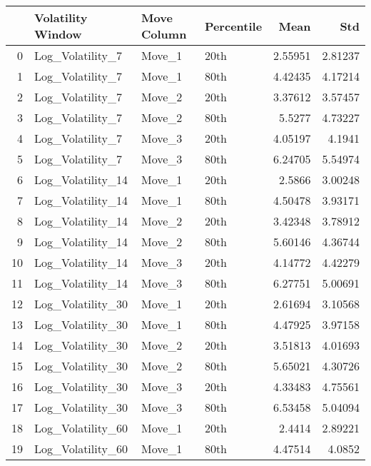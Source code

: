 \begin{tabular}{rlllrr}
\hline
    & Volatility Window   & Move Column   & Percentile   &    Mean &     Std \\
\hline
  0 & Log\_Volatility\_7    & Move\_1        & 20th         & 2.55951 & 2.81237 \\
  1 & Log\_Volatility\_7    & Move\_1        & 80th         & 4.42435 & 4.17214 \\
  2 & Log\_Volatility\_7    & Move\_2        & 20th         & 3.37612 & 3.57457 \\
  3 & Log\_Volatility\_7    & Move\_2        & 80th         & 5.5277  & 4.73227 \\
  4 & Log\_Volatility\_7    & Move\_3        & 20th         & 4.05197 & 4.1941  \\
  5 & Log\_Volatility\_7    & Move\_3        & 80th         & 6.24705 & 5.54974 \\
  6 & Log\_Volatility\_14   & Move\_1        & 20th         & 2.5866  & 3.00248 \\
  7 & Log\_Volatility\_14   & Move\_1        & 80th         & 4.50478 & 3.93171 \\
  8 & Log\_Volatility\_14   & Move\_2        & 20th         & 3.42348 & 3.78912 \\
  9 & Log\_Volatility\_14   & Move\_2        & 80th         & 5.60146 & 4.36744 \\
 10 & Log\_Volatility\_14   & Move\_3        & 20th         & 4.14772 & 4.42279 \\
 11 & Log\_Volatility\_14   & Move\_3        & 80th         & 6.27751 & 5.00691 \\
 12 & Log\_Volatility\_30   & Move\_1        & 20th         & 2.61694 & 3.10568 \\
 13 & Log\_Volatility\_30   & Move\_1        & 80th         & 4.47925 & 3.97158 \\
 14 & Log\_Volatility\_30   & Move\_2        & 20th         & 3.51813 & 4.01693 \\
 15 & Log\_Volatility\_30   & Move\_2        & 80th         & 5.65021 & 4.30726 \\
 16 & Log\_Volatility\_30   & Move\_3        & 20th         & 4.33483 & 4.75561 \\
 17 & Log\_Volatility\_30   & Move\_3        & 80th         & 6.53458 & 5.04094 \\
 18 & Log\_Volatility\_60   & Move\_1        & 20th         & 2.4414  & 2.89221 \\
 19 & Log\_Volatility\_60   & Move\_1        & 80th         & 4.47514 & 4.0852  \\

\end{tabular}
